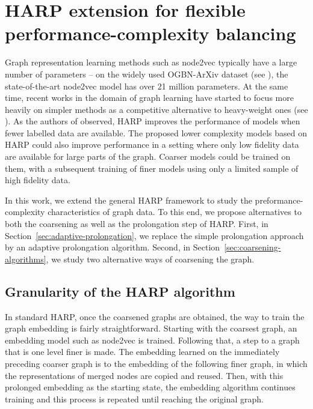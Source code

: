 \section{HARP extension for flexible performance-complexity balancing}\label{sec:our-method}

Graph representation learning methods such as node2vec typically have a large number of parameters -- on the widely used OGBN-ArXiv dataset (see \cite{hu_open_2021}), the state-of-the-art node2vec model has over 21 million parameters. At the same time, recent works in the domain of graph learning have started to focus more heavily on simpler methods as a competitive alternative to heavy-weight ones (see \cite{frasca_sign_2020,huang_combining_2020}). As the authors of \cite{chen_harp_2018} observed, HARP improves the performance of models when fewer labelled data are available. The proposed lower complexity models based on HARP could also improve performance in a setting where only low fidelity data are available for large parts of the graph. Coarser models could be trained on them, with a subsequent training of finer models using only a limited sample of high fidelity data.

In this work, we extend the general HARP framework to study the preformance-complexity characteristics of graph data. To this end, we propose alternatives to both the coarsening as well as the prolongation step of HARP. First, in Section~\ref{sec:adaptive-prolongation}, we replace the simple prolongation approach by an adaptive prolongation algorithm. Second, in Section~\ref{sec:coarsening-algorithms}, we study two alternative ways of coarsening the graph.

\subsection{Granularity of the HARP algorithm}

In standard HARP, once the coarsened graphs are obtained, the way to train the graph embedding is fairly straightforward. Starting with the coarsest graph, an embedding model such as node2vec is trained. Following that, a step to a graph that is one level finer is made. The embedding learned on the immediately preceding coarser graph is  to the embedding of the following finer graph, in which the representations of merged nodes are copied and reused.
 Then, with this prolonged embedding as the starting state, the embedding algorithm continues training and this process is repeated until reaching the original graph.

